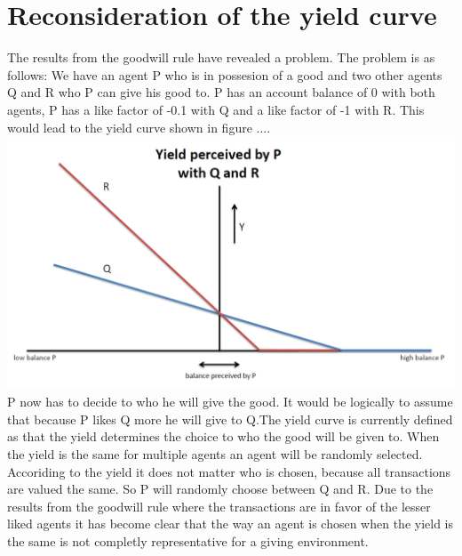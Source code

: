 \documentclass[twoside,openright]{uva-bachelor-thesis}
\begin{document}
\section{Reconsideration of the yield curve}
The results from the goodwill rule have revealed a problem. The problem is as follows: We have an agent P who is in possesion of a good and two other agents Q and R who P can give his good to. P has an account balance of 0 with both agents, P has a like factor of -0.1 with Q and a like factor of -1 with R. This would lead to the yield curve shown in figure .... \\
\includegraphics[scale=0.4]{YieldCurves/yieldcurve_P_QR}
\\
P now has to decide to who he will give the good. It would be logically to assume that because P likes Q more he will give to Q.The yield curve is currently defined as that the yield determines the choice to who the good will be given to. When the yield is the same for multiple agents an agent will be randomly selected. Accoriding to the yield it does not matter who is chosen, because all transactions are valued the same. So P will randomly choose between Q and R. Due to the results from the goodwill rule where the transactions are in favor of the lesser liked agents it has become clear that the way an agent is chosen when the yield is the same is not completly representative for a giving environment.
\end{document}
